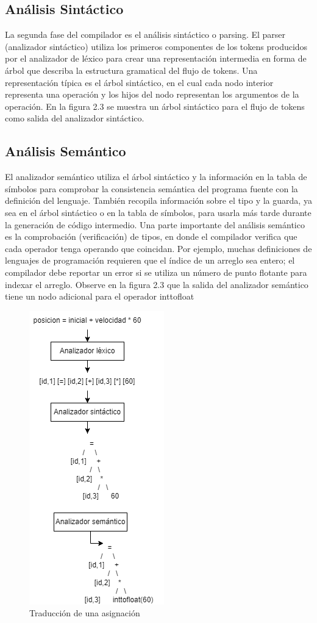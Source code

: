 \subsection{Análisis Sintáctico}
La segunda fase del compilador es el análisis sintáctico o parsing. El parser (analizador sintáctico) utiliza los primeros componentes de los tokens producidos por el analizador de léxico para crear una representación intermedia en forma de árbol que describa la estructura gramatical del flujo de tokens. Una representación típica es el árbol sintáctico, en el cual cada nodo interior representa una operación y los hijos del nodo representan los argumentos de la operación.
En la figura 2.3 se muestra un árbol sintáctico para el flujo de tokens como salida del analizador sintáctico.
\subsection{Análisis Semántico}
El analizador semántico utiliza el árbol sintáctico y la información en la tabla de símbolos para comprobar la consistencia semántica del programa fuente con la definición del lenguaje. También recopila información sobre el tipo y la guarda, ya sea en el árbol sintáctico o en la tabla de símbolos, para usarla más tarde durante la generación de código intermedio.
Una parte importante del análisis semántico es la comprobación (verificación) de tipos, en donde el compilador verifica que cada operador tenga operando que coincidan. Por ejemplo, muchas definiciones de lenguajes de programación requieren que el índice de un arreglo sea entero; el compilador debe reportar un error si se utiliza un número de punto flotante para indexar el arreglo.
Observe en la figura 2.3 que la salida del
analizador semántico tiene un nodo adicional para el operador inttofloat
\begin{figure}[htb]
\centering
\includegraphics[scale=0.8]{imagenes/traduccionDeAsignacion}
\caption{Traducción de una asignación}
\end{figure}
